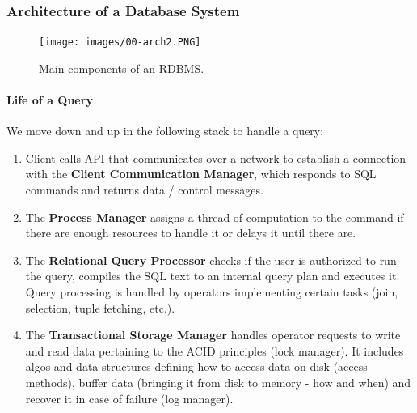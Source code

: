 \subsubsection{Architecture of a Database System}

\begin{figure}[h]
	\centering
	\texttt{[image: images/00-arch2.PNG]}
	\caption{Main components of an RDBMS.}
	\label{fig:arch2}
\end{figure}

\paragraph{Life of a Query}
We move down and up in the following stack to handle a query:
\begin{enumerate}
    \item Client calls API that communicates over a network to establish a connection with the \textbf{Client Communication Manager}, which responds to SQL commands and returns data / control messages.
    \item The \textbf{Process Manager} assigns a thread of computation to the command if there are enough resources to handle it or delays it until there are.
    \item The \textbf{Relational Query Processor} checks if the user is authorized to run the query, compiles the SQL text to an internal query plan and executes it. Query processing is handled by operators implementing certain tasks (join, selection, tuple fetching, etc.).
    \item The \textbf{Transactional Storage Manager} handles operator requests to write and read data pertaining to the ACID principles (lock manager). It includes algos and data structures defining how to access data on disk (access methods), buffer data (bringing it from disk to memory - how and when) and recover it in case of failure (log manager).
\end{enumerate}

